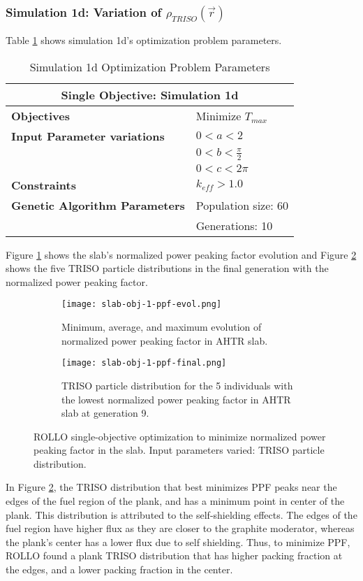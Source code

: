 \subsubsection{Simulation 1d: Variation of $\rho_{TRISO}(\vec{r})$}
Table \ref{tab:simulation1d} shows simulation 1d's optimization problem parameters. 
\begin{table}[H]
    \centering
    \onehalfspacing
    \caption{Simulation 1d Optimization Problem Parameters}
	\label{tab:simulation1d}
    \footnotesize
    \begin{tabular}{l|p{3cm}}
    \hline 
    \multicolumn{2}{c}{\textbf{Single Objective: Simulation 1d}} \\
    \hline 
    \textbf{Objectives} & Minimize $T_{max}$ \\
    \hline 
    \textbf{Input Parameter variations} & $0<a<2$ \\
    & $0<b<\frac{\pi}{2}$ \\
    & $0<c<2\pi$ \\
    \hline
    \textbf{Constraints} & $k_{eff} > 1.0$\\ 
    \hline 
    \textbf{Genetic Algorithm Parameters} & Population size: 60 \\
    & Generations: 10 \\
    \hline
    \end{tabular}
\end{table}
Figure \ref{fig:slab-obj-1-ppf-evol} shows the slab's normalized power peaking 
factor evolution and Figure \ref{fig:slab-obj-1-ppf-final} shows the five TRISO particle 
distributions in the final generation with the normalized power peaking factor.
\begin{figure}[]
    \centering
    \begin{subfigure}{\textwidth}
        \texttt{[image: slab-obj-1-ppf-evol.png]}
        \caption{Minimum, average, and maximum evolution of normalized power 
        peaking factor in AHTR slab.}
        \label{fig:slab-obj-1-ppf-evol} 
    \end{subfigure}
    \begin{subfigure}{\textwidth}
        \texttt{[image: slab-obj-1-ppf-final.png]}
        \caption{TRISO particle distribution for the 5 individuals with the 
        lowest normalized power peaking factor in AHTR slab at generation 9.}
        \label{fig:slab-obj-1-ppf-final} 
    \end{subfigure}
    \caption{ROLLO single-objective optimization to minimize normalized power 
    peaking factor in the slab. Input parameters varied: TRISO particle distribution.}
    \label{fig:slab-obj-1-ppf}
\end{figure}
In Figure \ref{fig:slab-obj-1-ppf-final}, the TRISO distribution that best minimizes 
PPF peaks near the edges of the fuel region of the plank, and has a minimum point in 
center of the plank.
This distribution is attributed to the self-shielding effects. 
The edges of the fuel region have higher flux as they are closer to the graphite 
moderator, whereas the plank's center has a lower flux due to self shielding. 
Thus, to minimize PPF, \gls{ROLLO} found a plank TRISO distribution that has higher 
packing fraction at the edges, and a lower packing fraction in the center. 

